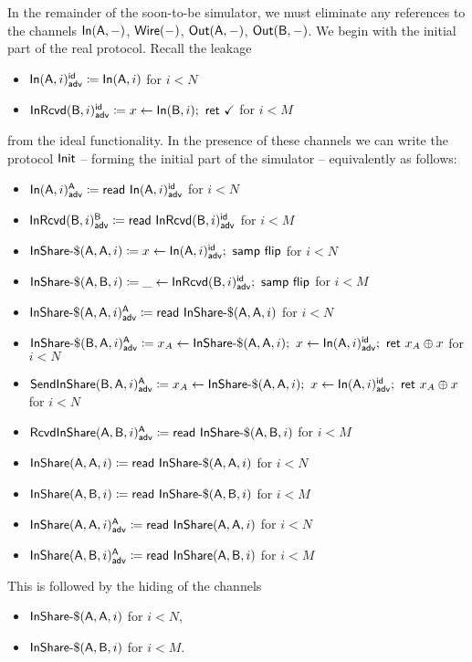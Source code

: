 \noindent In the remainder of the soon-to-be simulator, we must eliminate any references to the channels $\In(\A,-)$,
 $\Wire(-)$, $\Out(\A,-)$, $\Out(\B,-)$. We begin with the initial part of the real protocol. Recall the leakage
\begin{itemize}
\item {\color{blue} $\LeakIn(\A,i)^\id_\adv \coloneqq \In(\A,i)$ for $i < N$}
\item {\color{blue} $\LeakInRcvd(\B,i)^\id_\adv \coloneqq x\leftarrow \In(\B,i); \ \ret{\checkmark}$ for $i < M$}
\end{itemize}
from the ideal functionality. In the presence of these channels we can write the protocol $\Init$ -- forming the initial part of the simulator -- equivalently as follows:

\begin{itemize}
\item {\color{blue} $\LeakIn(\A,i)^{\A}_\adv \coloneqq \read{\LeakIn(\A,i)^\id_\adv}$ for $i < N$}
\item {\color{blue} $\LeakInRcvd(\B,i)^{\B}_\adv \coloneqq \read{\LeakInRcvd(\B,i)^\id_\adv}$ for $i < M$}
\item $\InShareGen(\A,\A,i) \coloneqq x \leftarrow \LeakIn(\A,i)^\id_\adv; \ \samp{\flip}$ for $i < N$
\item $\InShareGen(\A,\B,i) \coloneqq \_ \leftarrow \LeakInRcvd(\B,i)^\id_\adv; \ \samp{\flip}$ for $i < M$
\item {\color{blue} $\LeakInShareGen(\A,\A,i)^\A_\adv \coloneqq \read{\InShareGen(\A,\A,i)}$ for $i < N$}
\item {\color{blue} $\LeakInShareGen(\B,\A,i)^\A_\adv \coloneqq x_A \leftarrow \InShareGen(\A,\A,i); \ x \leftarrow \LeakIn(\A,i)^\id_\adv; \ \ret{x_A \oplus x}$ for $i < N$}
\item {\color{blue} $\LeakSendInShare(\B,\A,i)^\A_\adv \coloneqq x_A \leftarrow \InShareGen(\A,\A,i); \ x \leftarrow \LeakIn(\A,i)^\id_\adv; \ \ret{x_A \oplus x}$ for $i < N$}
\item {\color{blue} $\LeakRcvdInShare(\A,\B,i)^\A_\adv \coloneqq \read{\InShareGen(\A,\B,i)}$ for $i < M$}
\item $\InShare(\A,\A,i) \coloneqq \read{\InShareGen(\A,\A,i)}$ for $i < N$
\item $\InShare(\A,\B,i) \coloneqq \read{\InShareGen(\A,\B,i)}$ for $i < M$
\item {\color{blue} $\LeakInShare(\A,\A,i)^\A_\adv \coloneqq \read{\InShare(\A,\A,i)}$ for $i < N$}
\item {\color{blue} $\LeakInShare(\A,\B,i)^\A_\adv \coloneqq \read{\InShare(\A,\B,i)}$ for $i < M$}
\end{itemize}
This is followed by the hiding of the channels
\begin{itemize}
\item $\InShareGen(\A,\A,i)$ for $i < N$,
\item $\InShareGen(\A,\B,i)$ for $i < M$.
\end{itemize}

